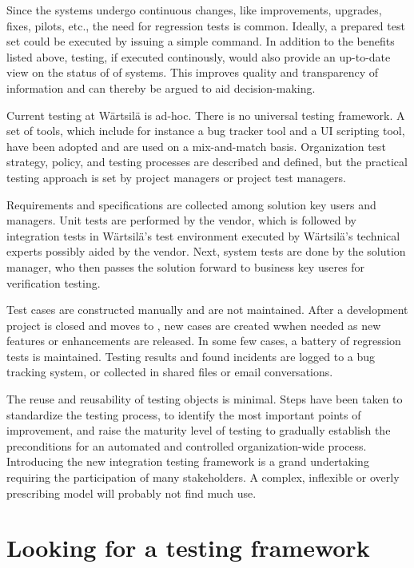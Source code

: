 \documentclass[12pt,a4paper,oneside,pdftex]{report}
\begin{document}
Since the systems undergo continuous changes, like improvements, upgrades, fixes, pilots, etc., the need for regression tests is common. Ideally, a prepared test set could be executed by issuing a simple command. In addition to the benefits listed above, testing, if executed continously, would also provide an up-to-date view on the status of of systems. This improves quality and transparency of information and can thereby be argued to aid decision-making.

Current testing at Wärtsilä is ad-hoc. There is no universal testing framework. A set of tools, which include for instance a bug tracker tool and a UI scripting tool, have been adopted and are used on a mix-and-match basis. Organization test strategy, policy, and testing processes are described and defined, but the practical testing approach is set by project managers or project test managers.

Requirements and specifications are collected among solution key users and managers. Unit tests are performed by the vendor, which is followed by integration tests in Wärtsilä's test environment executed by Wärtsilä's technical experts possibly aided by the vendor. Next, system tests are done by the solution manager, who then passes the solution forward to business key useres for verification testing. %

Test cases are constructed manually and are not maintained. After a development project is closed and moves to , new cases are created wwhen needed as new features or enhancements are released. In some few cases, a battery of regression tests is maintained. Testing results and found incidents are logged to a bug tracking system, or collected in shared files or email conversations. 

The reuse and reusability of testing objects is minimal. Steps have been taken to standardize the testing process, to identify the most important points of improvement, and raise the maturity level of testing to gradually establish the preconditions for an automated and controlled organization-wide process. Introducing the new integration testing framework is a grand undertaking requiring the participation of many stakeholders. A complex, inflexible or overly prescribing model will probably not find much use.

\chapter{Looking for a testing framework}
\label{chapter:integration testing} %
\end{document}
